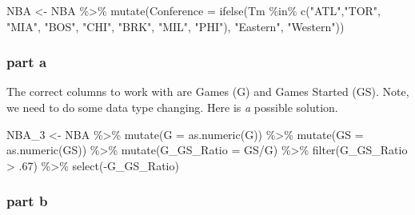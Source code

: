 \documentclass[
]{article}
\newenvironment{Shaded}{\begin{snugshade}}{\end{snugshade}}
\newcommand{\AttributeTok}[1]{\textcolor[rgb]{0.77,0.63,0.00}{#1}}
\newcommand{\DecValTok}[1]{\textcolor[rgb]{0.00,0.00,0.81}{#1}}
\newcommand{\FunctionTok}[1]{\textcolor[rgb]{0.00,0.00,0.00}{#1}}
\newcommand{\NormalTok}[1]{#1}
\newcommand{\OtherTok}[1]{\textcolor[rgb]{0.56,0.35,0.01}{#1}}
\newcommand{\SpecialCharTok}[1]{\textcolor[rgb]{0.00,0.00,0.00}{#1}}
\newcommand{\StringTok}[1]{\textcolor[rgb]{0.31,0.60,0.02}{#1}}
\begin{document}
\begin{Shaded}
\begin{Highlighting}[]
\NormalTok{NBA }\OtherTok{\textless{}{-}}\NormalTok{ NBA }\SpecialCharTok{\%\textgreater{}\%} \FunctionTok{mutate}\NormalTok{(}\AttributeTok{Conference =} 
                 \FunctionTok{ifelse}\NormalTok{(Tm }\SpecialCharTok{\%in\%} \FunctionTok{c}\NormalTok{(}\StringTok{"ATL"}\NormalTok{,}\StringTok{"TOR"}\NormalTok{, }\StringTok{"MIA"}\NormalTok{, }\StringTok{"BOS"}\NormalTok{, }\StringTok{"CHI"}\NormalTok{,}
                                  \StringTok{"BRK"}\NormalTok{, }\StringTok{"MIL"}\NormalTok{, }\StringTok{"PHI"}\NormalTok{), }\StringTok{"Eastern"}\NormalTok{,}
                                   \StringTok{"Western"}\NormalTok{))}
\end{Highlighting}
\end{Shaded}

\hypertarget{part-a}{%
\subsubsection{part a}\label{part-a}}

The correct columns to work with are Games (G) and Games Started (GS).
Note, we need to do some data type changing. Here is \emph{a} possible
solution.

\begin{Shaded}
\begin{Highlighting}[]
\NormalTok{NBA\_3 }\OtherTok{\textless{}{-}}\NormalTok{ NBA }\SpecialCharTok{\%\textgreater{}\%} \FunctionTok{mutate}\NormalTok{(}\AttributeTok{G =} \FunctionTok{as.numeric}\NormalTok{(G)) }\SpecialCharTok{\%\textgreater{}\%} \FunctionTok{mutate}\NormalTok{(}\AttributeTok{GS =} \FunctionTok{as.numeric}\NormalTok{(GS)) }\SpecialCharTok{\%\textgreater{}\%}
  \FunctionTok{mutate}\NormalTok{(}\AttributeTok{G\_GS\_Ratio =}\NormalTok{ GS}\SpecialCharTok{/}\NormalTok{G) }\SpecialCharTok{\%\textgreater{}\%} \FunctionTok{filter}\NormalTok{(G\_GS\_Ratio }\SpecialCharTok{\textgreater{}}\NormalTok{ .}\DecValTok{67}\NormalTok{) }\SpecialCharTok{\%\textgreater{}\%}
  \FunctionTok{select}\NormalTok{(}\SpecialCharTok{{-}}\NormalTok{G\_GS\_Ratio)}
\end{Highlighting}
\end{Shaded}

\hypertarget{part-b}{%
\subsubsection{part b}\label{part-b}}
\end{document}
